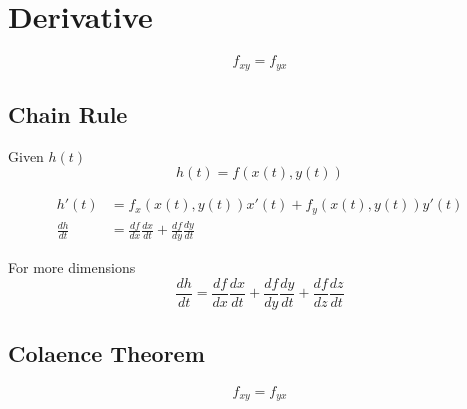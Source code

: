 \section{Derivative}

  \begin{equation}
    f_{xy} = f_{yx}
  \end{equation}

  \subsection{Chain Rule}

    Given $ h(t) $
    \begin{displaymath}
      h(t) = f(x(t), y(t))
    \end{displaymath}

    \begin{align}
      h'(t)
        &= f_{x}\left( x(t), y(t) \right) x'(t)
        + f_{y} \left(x(t), y(t) \right) y'(t) \\
      \frac{dh}{dt}
        &= \frac{df}{dx} \frac{dx}{dt}
        + \frac{df}{dy} \frac{dy}{dt}
    \end{align}

    For more dimensions
    \begin{equation}
      \frac{dh}{dt}
        = \frac{df}{dx} \frac{dx}{dt}
        + \frac{df}{dy} \frac{dy}{dt}
        + \frac{df}{dz} \frac{dz}{dt}
    \end{equation}

  \subsection{Colaence Theorem}

    \begin{equation}
      f_{xy} = f_{yx}
    \end{equation}